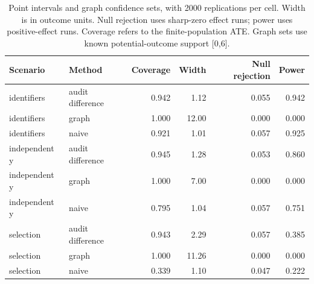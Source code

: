 \begin{table}[htbp]\centering\small
\caption{Point intervals and graph confidence sets, with 2000 replications per cell. Width is in outcome units. Null rejection uses sharp-zero effect runs; power uses positive-effect runs. Coverage refers to the finite-population ATE. Graph sets use known potential-outcome support [0,6].}
\begin{tabular}{llrrrr}\toprule
Scenario & Method & Coverage & Width & Null rejection & Power\\\midrule
identifiers & audit difference & 0.942 & 1.12 & 0.055 & 0.942\\
identifiers & graph & 1.000 & 12.00 & 0.000 & 0.000\\
identifiers & naive & 0.921 & 1.01 & 0.057 & 0.925\\
independent y & audit difference & 0.945 & 1.28 & 0.053 & 0.860\\
independent y & graph & 1.000 & 7.00 & 0.000 & 0.000\\
independent y & naive & 0.795 & 1.04 & 0.057 & 0.751\\
selection & audit difference & 0.943 & 2.29 & 0.057 & 0.385\\
selection & graph & 1.000 & 11.26 & 0.000 & 0.000\\
selection & naive & 0.339 & 1.10 & 0.047 & 0.222\\
\bottomrule\end{tabular}\end{table}
